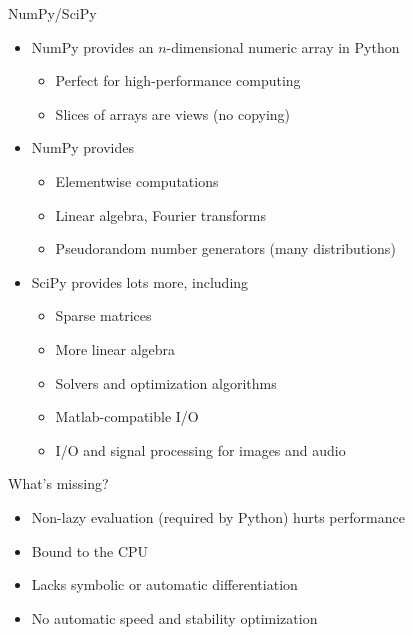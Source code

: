 \documentclass[utf8x,xcolor=pdftex,dvipsnames,table]{beamer}
\begin{document}
\begin{frame}{NumPy/SciPy}
  \begin{itemize}

  \item NumPy provides an $n$-dimensional numeric array in Python
      \begin{itemize}
      \item Perfect for high-performance computing
      \item Slices of arrays are views (no copying)
      \end{itemize}

  \item NumPy provides
      \begin{itemize}
      \item Elementwise computations
      \item Linear algebra, Fourier transforms
      \item Pseudorandom number generators (many distributions)
      \end{itemize}

  \item SciPy provides lots more, including
      \begin{itemize}
      \item Sparse matrices
      \item More linear algebra
      \item Solvers and optimization algorithms
      \item Matlab-compatible I/O
      \item I/O and signal processing for images and audio
      \end{itemize}
  \end{itemize}
\end{frame}

\begin{frame}{What's missing?}
  \begin{itemize}
    \item Non-lazy evaluation (required by Python) hurts performance
    \item Bound to the CPU
    \item Lacks symbolic or automatic differentiation
    \item No automatic speed and stability optimization
  \end{itemize}

\end{frame}
\end{document}
